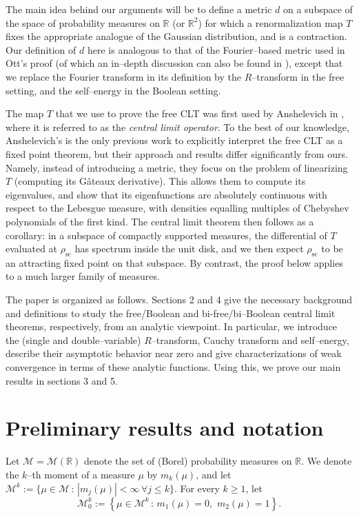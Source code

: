\documentclass{amsart}
\theoremstyle{definition}
\theoremstyle{remark}
\numberwithin{equation}{section}
\begin{document}
\bigskip

The main idea behind our arguments will be to define a metric $d$ on a subspace of the space of probability measures on $\mathbb{R}$ (or $\mathbb{R}^2$) for which a {renormalization} map $T$ fixes the appropriate analogue of the Gaussian distribution, and is a contraction. Our definition of $d$ here is analogous to that of the Fourier--based metric used in Ott's proof \cite{ott} (of which an in--depth discussion can also be found in \cite{jose}), except that we replace the Fourier transform in its definition by the $R$--transform in the free setting, and the self--energy in the Boolean setting. 

The map $T$ that we use to prove the free CLT was first used by Anshelevich in  \cite{Anshelevich1998TheLO}, where it is referred to as the \textit{central limit operator}. To the best of our knowledge, Anshelevich's is the only previous work to explicitly interpret the free CLT as a fixed point theorem, but their approach and results differ significantly from ours. Namely, instead of introducing a metric, they focus on the problem of linearizing $T$ (computing its G{\^a}teaux derivative). This allows them to compute its eigenvalues, and show that its eigenfunctions are absolutely continuous with respect to the Lebesgue measure, with densities equalling multiples of Chebyshev polynomials of the first kind. The central limit theorem then follows as a corollary: in a subspace of compactly supported measures, the differential of $T$ evaluated at $\rho_{\text{sc}}$ has spectrum inside the unit disk, and we then expect $\rho_{\text{sc}}$ to be an attracting fixed point on that subspace. By contrast, the proof below applies to a much larger family of measures.

The paper is organized as follows. Sections 2 and 4 give the necessary background and definitions to study the free/Boolean and bi-free/bi--Boolean central limit theorems, respectively, from an analytic viewpoint. In particular, we introduce the (single and double--variable) $R$--transform, Cauchy transform and self--energy, describe their asymptotic behavior near zero and give characterizations of weak convergence in terms of these analytic functions. Using this, we prove our main results in sections 3 and 5.
\section{Preliminary results and notation}

Let $\mathcal{M}=\mathcal{M}(\mathbb{R})$ denote the set of (Borel) probability measures on $\mathbb{R}$. We denote the $k$--th moment of a measure $\mu$ by $m_k(\mu)$, and let $\mathcal{M}^k:=\{\mu\in \mathcal{M}\,:\, |m_j(\mu)|<\infty \, \forall j\leq k\}$. For every $k\geq 1$, let
\[
    \mathcal{M}_0^k := \left\{\mu \in \mathcal{M}^k \,:\, m_1(\mu)=0,\,\,m_2(\mu)=1\right\}.
\]
\end{document}

